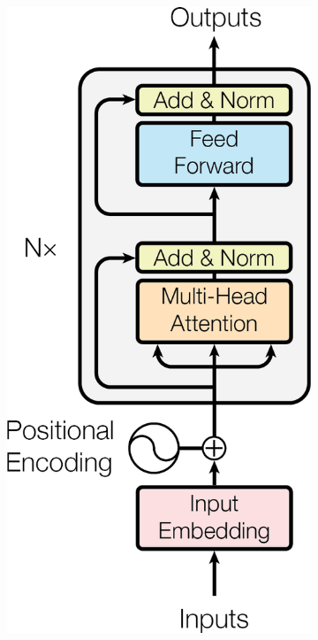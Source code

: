 \begin{figure}[htbp]
    \centering
    \begin{subfigure}{0.2\textwidth}
        \includegraphics[width=\textwidth]{images/Transformer/TF_Encoder.png}


\end{subfigure}
\end{figure}

